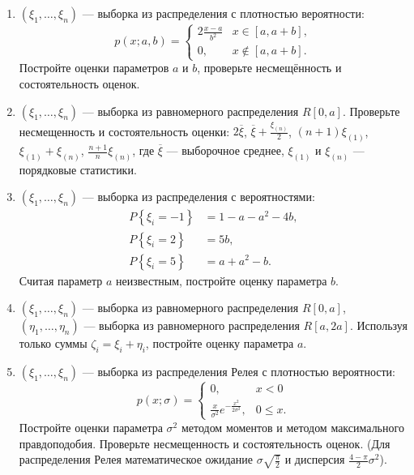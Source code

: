 \documentclass[a4paper,12pt]{article}
\newcommand{\probability}[1]{P \left\{ #1 \right\}}
\newcommand{\sample}[2]{\left( #1_1, \dots, #1_{#2} \right)}
\begin{document}
\begin{enumerate}[resume, topsep=1cm, parsep=1cm]
        \item $\sample{\xi}{n}$ --- выборка из распределения с плотностью вероятности:
              \[
                  p(x; a, b)
                  = \left \{
                  \begin{array}{ll}
                      2 \frac{x-a}{b^2} & x \in [a, a + b],     \\
                      0,                & x \notin [a, a + b] .
                  \end{array}
                  \right .
              \]
              Постройте оценки параметров $a$ и $b$, проверьте несмещённость и состоятельность оценок.

        \item $\sample{\xi}{n}$ --- выборка из равномерного распределения $R[0, a]$. Проверьте несмещенность и состоятельность оценки:
              $2 \overline{\xi}$, $\overline{\xi} + \frac{\xi_{(n)}}{2}$, $(n+1) \xi_{(1)}$, $\xi_{(1)} + \xi_{(n)}$, $\frac{n+1}{n} \xi_{(n)}$,
              где $\overline{\xi}$ --- выборочное среднее, $\xi_{(1)}$ и $\xi_{(n)}$ --- порядковые статистики.

        \item $\sample{\xi}{n}$ --- выборка из распределения с вероятностями:
              \begin{align*}
                  \probability{\xi_i = -1} & = 1 - a - a^2 - 4b , \\
                  \probability{\xi_i = 2}  & =  5b ,              \\
                  \probability{\xi_i = 5}  & = a + a^2 - b .
              \end{align*}
              Считая параметр $a$ неизвестным, постройте оценку параметра $b$.

        \item $\sample{\xi}{n}$ --- выборка из равномерного распределения $R[0,a]$, $\sample{\eta}{n}$ --- выборка из равномерного распределения $R[a, 2a]$.
              Используя только суммы $\zeta_i = \xi_i + \eta_i$, постройте оценку параметра $a$.

        \item $\sample{\xi}{n}$ --- выборка из распределения Релея с плотностью вероятности:
              \[
                  p(x; \sigma)
                  = \left \{
                  \begin{array}{ll}
                      0,                                              & x < 0     \\
                      \frac{x}{\sigma^2} e^{-\frac{x^2}{2 \sigma^2}}, & 0 \le x .
                  \end{array}
                  \right .
              \]
              Постройте оценки параметра $\sigma^2$ методом моментов и методом максимального правдоподобия. Проверьте несмещенность и состоятельность
              оценок. (Для распределения Релея математическое ожидание $\sigma \sqrt{\frac{\pi}{2}}$ и дисперсия $\frac{4-\pi}{2} \sigma^2$).


\end{enumerate}
\end{document}
